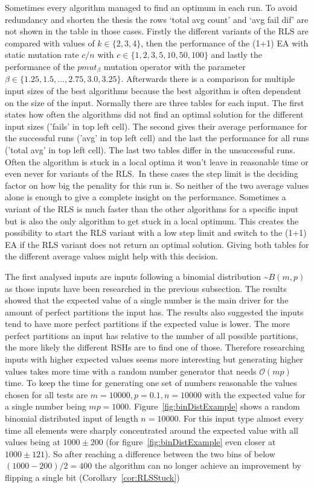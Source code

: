 Sometimes every algorithm managed to find an optimum in each run.
To avoid redundancy and shorten the thesis the rows `total avg count' and `avg fail dif' are not shown in the table in those cases.\newline
Firstly the different variants of the RLS are compared with values of $k \in\{2,3,4\}$, then the performance of the (1+1) EA with static mutation rate $c/n$ with $c \in\{1,2,3,5,10,50,100\}$ and lastly the performance of the $pmut_\beta$ mutation operator with the parameter $\beta \in \{1.25, 1.5, \dots, 2.75,3.0,3.25\}$.
Afterwards there is a comparison for multiple input sizes of the best algorithms because the best algorithm is often dependent on the size of the input.
Normally there are three tables for each input.
The first states how often the algorithms did not find an optimal solution for the different input sizes ('fails' in top left cell).
The second gives their average performance for the successful runs ('avg' in top left cell) and the last the performance for all runs ('total avg' in top left cell).
The last two tables differ in the unsuccessful runs.
Often the algorithm is stuck in a local optima it won't leave in reasonable time or even never for variants of the RLS.\ 
In these cases the step limit is the deciding factor on how big the penality for this run is.
So neither of the two average values alone is enough to give a complete insight on the performance.
Sometimes a variant of the RLS is much faster than the other algorithms for a specific input but is also the only algorithm to get stuck in a local optimum.
This creates the possibility to start the RLS variant with a low step limit and switch to the (1+1) EA if the RLS variant does not return an optimal solution.
Giving both tables for the different average values might help with this decision.

The first analysed inputs are inputs following a binomial distribution \textasciitilde$B(m,p)$ as those inputs have been researched in the previous subsection.
The results showed that the expected value of a single number is the main driver for the amount of perfect partitions the input has.
The results also suggested the inputs tend to have more perfect partitions if the expected value is lower.
The more perfect partitions an input has relative to the number of all possible partitions, the more likely the different RSHs are to find one of those.
Therefore researching inputs with higher expected values seems more interesting but generating higher values takes more time with a random number generator that needs $\mathcal{O}(mp)$ time.
To keep the time for generating one set of numbers reasonable the values chosen for all tests are $m=10000, p=0.1, n=10000$ with the expected value for a single number being $mp=1000$.
Figure~\ref{fig:binDistExample} shows a random binomial distributed input of length $n=10000$.
For this input type almost every time all elements were sharply concentrated around the expected value with all values being at $1000\pm200$ (for figure~\ref{fig:binDistExample} even closer at $1000\pm121$).
So after reaching a difference between the two bins of below $(1000-200)/2=400$ the algorithm can no longer achieve an improvement by flipping a single bit (Corollary~\ref{cor:RLSStuck})

